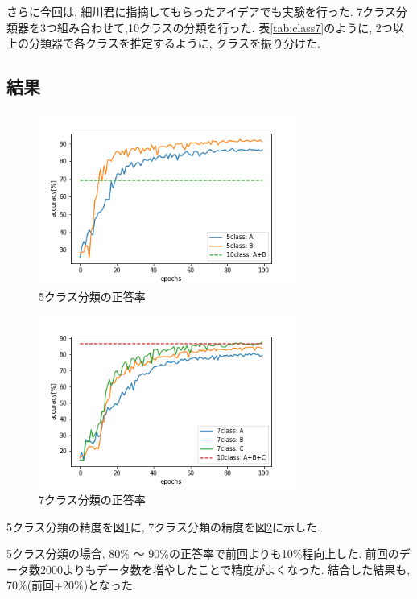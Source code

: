 \documentclass[twocolumn]{jarticle}     %
\begin{document}
さらに今回は, 細川君に指摘してもらったアイデアでも実験を行った. 7クラス分類器を3つ組み合わせて,10クラスの分類を行った. 表\ref{tab:class7}のように, 2つ以上の分類器で各クラスを推定するように, クラスを振り分けた.

\subsection{結果}

\begin{figure}[tb]
	\begin{center}
		\includegraphics[clip,width=8.5cm]{accuracy5.png}
		\caption{5クラス分類の正答率}
		\label{fig:accuracy5}
	\end{center}
\end{figure}

\begin{figure}[tb]
	\begin{center}
		\includegraphics[clip,width=8.5cm]{accuracy7.png}
		\caption{7クラス分類の正答率}
		\label{fig:accuracy7}
	\end{center}
\end{figure}

5クラス分類の精度を図\ref{fig:accuracy5}に, 7クラス分類の精度を図\ref{fig:accuracy7}に示した.

5クラス分類の場合, 80\% ～ 90\%の正答率で前回よりも10\%程向上した. 前回のデータ数2000よりもデータ数を増やしたことで精度がよくなった. 結合した結果も, 70\%(前回+20\%)となった.
\end{document}
